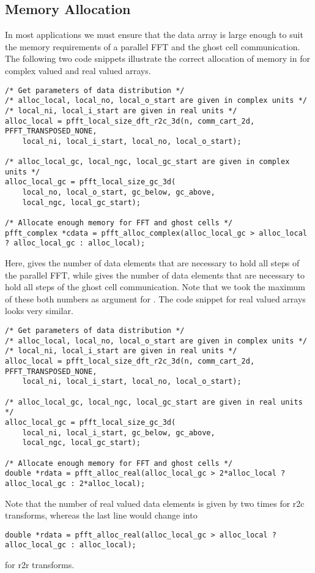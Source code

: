 \subsection{Memory Allocation}
In most applications we must ensure that the data array is large enough to suit the memory requirements of
a parallel FFT and the ghost cell communication.
The following two code snippets illustrate the correct allocation of memory in for complex valued and real valued arrays.
\begin{lstlisting}
/* Get parameters of data distribution */
/* alloc_local, local_no, local_o_start are given in complex units */
/* local_ni, local_i_start are given in real units */
alloc_local = pfft_local_size_dft_r2c_3d(n, comm_cart_2d, PFFT_TRANSPOSED_NONE,
    local_ni, local_i_start, local_no, local_o_start);

/* alloc_local_gc, local_ngc, local_gc_start are given in complex units */
alloc_local_gc = pfft_local_size_gc_3d(
    local_no, local_o_start, gc_below, gc_above,
    local_ngc, local_gc_start);

/* Allocate enough memory for FFT and ghost cells */
pfft_complex *cdata = pfft_alloc_complex(alloc_local_gc > alloc_local ? alloc_local_gc : alloc_local);
\end{lstlisting}
Here,  gives the number of data elements that are necessary to hold all steps of the parallel FFT, while
 gives the number of data elements that are necessary to hold all steps of the ghost cell communication.
Note that we took the maximum of these both numbers as argument for .
The code snippet for real valued arrays looks very similar.
\begin{lstlisting}
/* Get parameters of data distribution */
/* alloc_local, local_no, local_o_start are given in complex units */
/* local_ni, local_i_start are given in real units */
alloc_local = pfft_local_size_dft_r2c_3d(n, comm_cart_2d, PFFT_TRANSPOSED_NONE,
    local_ni, local_i_start, local_no, local_o_start);

/* alloc_local_gc, local_ngc, local_gc_start are given in real units */
alloc_local_gc = pfft_local_size_gc_3d(
    local_ni, local_i_start, gc_below, gc_above,
    local_ngc, local_gc_start);

/* Allocate enough memory for FFT and ghost cells */
double *rdata = pfft_alloc_real(alloc_local_gc > 2*alloc_local ? alloc_local_gc : 2*alloc_local);
\end{lstlisting}
Note that the number of real valued data elements is given by two times  for r2c transforms, whereas the last line would change into
\begin{lstlisting}
double *rdata = pfft_alloc_real(alloc_local_gc > alloc_local ? alloc_local_gc : alloc_local);
\end{lstlisting}
for r2r transforms.

